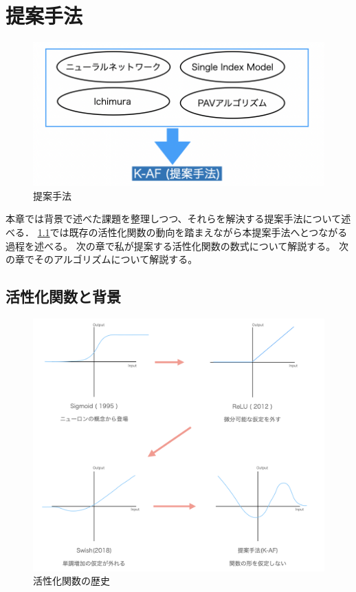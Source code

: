 \chapter{提案手法}
\label{proposed}



\begin{figure}[hbtp]
\includegraphics[width=15cm]{asset/proposed_method.png}
	\caption{提案手法}
	\label{proposed_method}
\end{figure}


本章では背景で述べた課題を整理しつつ、それらを解決する提案手法について述べる．
\ref{history_activation}では既存の活性化関数の動向を踏まえながら本提案手法へとつながる過程を述べる。
次の章で私が提案する活性化関数の数式について解説する。
次の章でそのアルゴリズムについて解説する。



\section{活性化関数と背景}
\label {history_activation}


\begin{figure}[hbtp]
\includegraphics[width=15cm]{asset/history_af.png}
	\caption{活性化関数の歴史}
	\label{history_af}
\end{figure}

